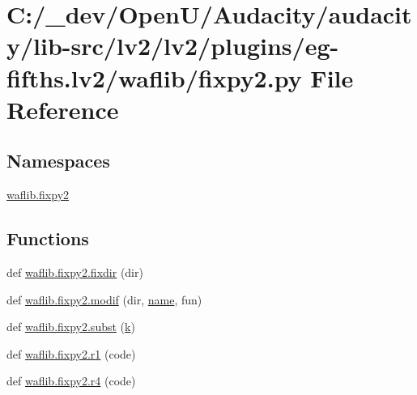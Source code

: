 \hypertarget{lv2_2plugins_2eg-fifths_8lv2_2waflib_2fixpy2_8py}{}\section{C\+:/\+\_\+dev/\+Open\+U/\+Audacity/audacity/lib-\/src/lv2/lv2/plugins/eg-\/fifths.lv2/waflib/fixpy2.py File Reference}
\label{lv2_2plugins_2eg-fifths_8lv2_2waflib_2fixpy2_8py}
\subsection*{Namespaces}
\begin{DoxyCompactItemize}
\item 
 \hyperlink{namespacewaflib_1_1fixpy2}{waflib.\+fixpy2}
\end{DoxyCompactItemize}
\subsection*{Functions}
\begin{DoxyCompactItemize}
\item 
def \hyperlink{namespacewaflib_1_1fixpy2_ab553b609bb1e5be9704eaa0018947909}{waflib.\+fixpy2.\+fixdir} (dir)
\item 
def \hyperlink{namespacewaflib_1_1fixpy2_a4c821ce0a3eff8e4ccbbf9daa9648270}{waflib.\+fixpy2.\+modif} (dir, \hyperlink{lib_2expat_8h_a1b49b495b59f9e73205b69ad1a2965b0}{name}, fun)
\item 
def \hyperlink{namespacewaflib_1_1fixpy2_a5f7f3e2b61180292e779e171dc5a1dbf}{waflib.\+fixpy2.\+subst} (\hyperlink{rfft2d_test_m_l_8m_adc468c70fb574ebd07287b38d0d0676d}{k})
\item 
def \hyperlink{namespacewaflib_1_1fixpy2_a721a8f58a4734bba827b4f6d985f98ff}{waflib.\+fixpy2.\+r1} (code)
\item 
def \hyperlink{namespacewaflib_1_1fixpy2_a3e64c393bc3c2aacf327ab18d56dd7ef}{waflib.\+fixpy2.\+r4} (code)
\end{DoxyCompactItemize}
